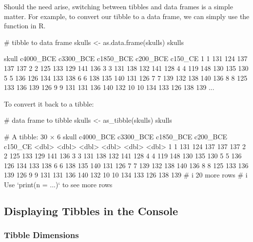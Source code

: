 Should the need arise, switching between tibbles and data frames is a simple matter. For example, to convert our tibble  to a data frame, we can simply use the  function in R.

\begin{inR}
# tibble to data frame
skulls <- as.data.frame(skulls)
skulls
\end{inR}
\begin{outR}
   skull c4000_BCE c3300_BCE c1850_BCE c200_BCE c150_CE
1      1       131       124       137      137     137
2      2       125       133       129      141     136
3      3       131       138       132      141     128
4      4       119       148       130      135     130
5      5       136       126       134      133     138
6      6       138       135       140      131     126
7      7       139       132       138      140     136
8      8       125       133       136      139     126
9      9       131       131       136      140     132
10    10       134       133       126      138     139
...
\end{outR}

\noindent
To convert it back to a tibble:
\begin{inR}
# data frame to tibble
skulls <- as_tibble(skulls)
skulls
\end{inR}
\begin{outR}
# A tibble: 30 × 6
   skull c4000_BCE c3300_BCE c1850_BCE c200_BCE c150_CE
   <dbl>     <dbl>     <dbl>     <dbl>    <dbl>   <dbl>
 1     1       131       124       137      137     137
 2     2       125       133       129      141     136
 3     3       131       138       132      141     128
 4     4       119       148       130      135     130
 5     5       136       126       134      133     138
 6     6       138       135       140      131     126
 7     7       139       132       138      140     136
 8     8       125       133       136      139     126
 9     9       131       131       136      140     132
10    10       134       133       126      138     139
# i 20 more rows
# i Use `print(n = ...)` to see more rows
\end{outR}

\subsection{Displaying Tibbles in the Console}

\subsubsection{Tibble Dimensions}

